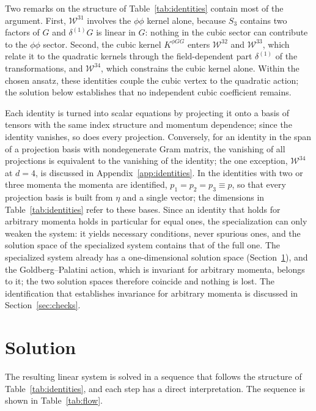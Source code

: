 \documentclass[prd,aps,preprint,superscriptaddress,nofootinbib,amsmath,amssymb,eqsecnum]{revtex4-2}
\newcommand{\W}{\mathcal{W}}
\begin{document}
Two remarks on the structure of Table~\ref{tab:identities} contain most of the argument. First,
$\W^{31}$ involves the $\phi\phi$ kernel alone, because $S_3$ contains two factors of $G$ and
$\delta^{(1)}G$ is linear in $G$: nothing in the cubic sector can contribute to the $\phi\phi$ sector.
Second, the cubic kernel $K^{\phi GG}$ enters $\W^{32}$ and $\W^{33}$, which relate it to
the quadratic kernels through the field-dependent part $\delta^{(1)}$ of the
transformations, and $\W^{34}$, which constrains the cubic kernel alone. Within the chosen
ansatz, these identities couple the cubic vertex to the quadratic action; the solution
below establishes that no independent cubic coefficient remains.

Each identity is turned into scalar equations by projecting it onto a basis of tensors with
the same index structure and momentum dependence; since the identity vanishes, so does every
projection. Conversely, for an identity in the span of a projection basis with nondegenerate
Gram matrix, the vanishing of all projections is equivalent to the vanishing of the identity;
the one exception, $\W^{34}$ at $d=4$, is discussed in Appendix~\ref{app:identities}. In the identities with two or three momenta the momenta are identified,
$p_1=p_2=p_3\equiv p$, so that every projection basis is built from $\eta$ and a single
vector; the dimensions in Table~\ref{tab:identities} refer to these bases. Since an identity
that holds for arbitrary momenta holds in particular for equal ones, the specialization can
only weaken the system: it yields necessary conditions, never spurious ones, and the solution
space of the specialized system contains that of the full one. The specialized system
already has a one-dimensional solution space (Section~\ref{sec:solution}), and the
Goldberg--Palatini action, which is invariant for arbitrary momenta, belongs to it; the two
solution spaces therefore coincide and nothing is lost. The identification that establishes
invariance for arbitrary momenta is discussed in Section~\ref{sec:checks}.

\section{Solution}
\label{sec:solution}

The resulting linear system is solved in a sequence that follows the structure of
Table~\ref{tab:identities}, and each step has a direct interpretation. The sequence is shown
in Table~\ref{tab:flow}.
\end{document}
